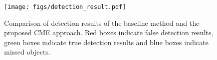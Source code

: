 \documentclass[final]{cvpr}
\begin{document}
\begin{comment}
\begin{figure}[t]
\centering
\texttt{[image: figs/D\_inter.pdf]}
\caption{Comparison of $D_{inter}$ and $D_{inter}-D_{intra}$.}
\label{fig:D_inter}
\end{figure}
\end{comment}

\begin{figure}[t]
\centering
\texttt{[image: figs/detection\_result.pdf]}
\caption{Comparison of detection results of the baseline method and the proposed CME approach. Red boxes indicate false detection results, green  boxes indicate true detection results and blue boxes indicate missed objects.}
\label{fig:examples}
\end{figure}
    
\end{document}
